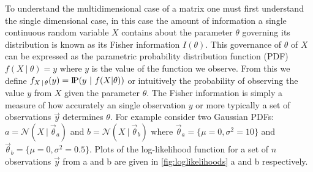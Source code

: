 To understand the multidimensional case of a matrix one must first understand the single dimensional case, in this case the amount of information a single continuous random variable $X$ contains about the parameter $\theta$ governing its distribution is known as its Fisher information $I(\theta)$. This governance of $\theta$ of $X$ can be expressed as the parametric probability distribution function (PDF) $f(X\ |\ \theta) = y$ where $y$ is the value of the function we observe. From this we define $f_{X\,|\,\theta}(y) = \probP(y\ |\ f(X|\theta))$ or intuitively the probability of observing the value $y$ from $X$ given the parameter $\theta$. The Fisher information is simply a measure of how accurately an single observation $y$ or more typically a set of observations $\vec{y}$ determines $\theta$. For example consider two Gaussian PDFs: $a = \mathcal{N}(X\ |\ \vec{\theta}_a)$ and $b = \mathcal{N}(X\ |\ \vec{\theta}_b)$ where $\vec{\theta}_a = \{\mu=0, \sigma^2=10\}$ and $\vec{\theta}_b = \{\mu=0,\sigma^2=0.5\}$. Plots of the log-likelihood function for a set of $n$ observations $\vec{y}$ from a and b are given in \cref{fig:loglikelihoods} a and b respectively.
